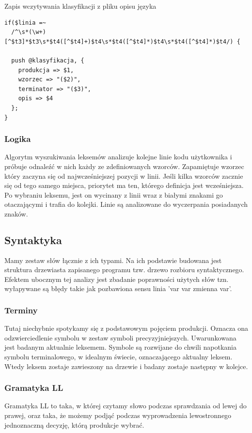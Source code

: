 \documentclass[a4paper,12pt]{article}
\begin{document}
Zapis wczytywania klasyfikacji z pliku opisu języka
\begin{verbatim}
if($linia =~
  /^\s*(\w+)[^$t3]*$t3\s*$t4([^$t4]+)$t4\s*$t4([^$t4]*)$t4\s*$t4([^$t4]*)$t4/) {
  
  push @klasyfikacja, {
    produkcja => $1,
    wzorzec => "($2)",
    terminator => "($3)",
    opis => $4
  };
}
\end{verbatim}
\subsubsection{Logika}
Algorytm wyszukiwania leksemów analizuje kolejne linie kodu użytkownika i próbuje odnaleźć w nich każdy ze zdefiniowanych wzorców. Zapamiętuje wzorzec który zaczyna się od najwcześniejszej pozycji w linii. Jeśli kilka wzorców zacznie się od tego samego miejsca, priorytet ma ten, którego definicja jest wcześniejsza. Po wybraniu leksemu, jest on wycinany z linii wraz z białymi znakami go otaczającymi i trafia do kolejki. Linie są analizowane do wyczerpania posiadanych znaków.
\newpage


\subsection{Syntaktyka}
Mamy zestaw słów łącznie z ich typami. Na ich podstawie budowana jest struktura drzewiasta zapisanego programu tzw. drzewo rozbioru syntaktycznego. Efektem ubocznym tej analizy jest zbadanie poprawności użytych słów tzn. wyłapywane są błędy takie jak pozbawiona sensu linia 'var var zmienna var'.
\subsubsection{Terminy}
Tutaj niechybnie spotykamy się z podstawowym pojęciem produkcji. Oznacza ona odzwierciedlenie symbolu w zestaw symboli precyzyjniejszych. Uwarunkowana jest badanym aktualnie leksemem. Symbole są rozwijane do chwili napotkania symbolu terminalowego, w idealnym świecie, oznaczającego aktualny leksem. Wtedy leksem zostaje zawieszony na drzewie i badany zostaje następny w kolejce.
\subsubsection{Gramatyka LL}
Gramatyka LL to taka, w której czytamy słowo podczas sprawdzania od lewej do prawej, oraz taka, że
możemy podjąć podczas wyprowadzenia lewostronnego jednoznaczną decyzję, którą produkcje
wybrać.
\end{document}
